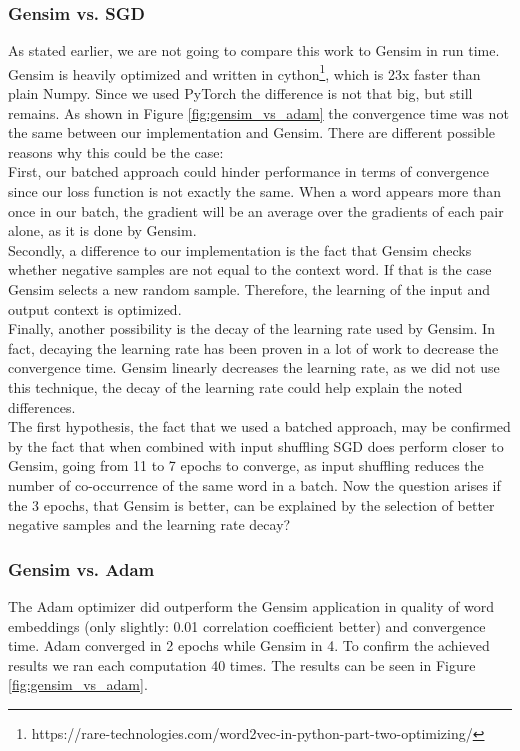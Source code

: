 \documentclass[conference]{IEEEtran}
\begin{document}
\subsubsection{Gensim vs. SGD}
As stated earlier, we are not going to compare this work to Gensim in run time. Gensim is heavily optimized and written in cython\footnote{https://rare-technologies.com/word2vec-in-python-part-two-optimizing/}, which is 23x faster than plain Numpy. Since we used PyTorch the difference is not that big, but still remains. As shown in Figure \ref{fig:gensim_vs_adam} the convergence time was not the same between our implementation and Gensim. There are different possible reasons why this could be the case:\\ First, our batched approach could hinder performance in terms of convergence since our loss function is not exactly the same. When a word appears more than once in our batch, the gradient will be an average over the gradients of each pair alone, as it is done by Gensim.\\ Secondly, a difference to our implementation is the fact that Gensim checks whether negative samples are not equal to the context word. If that is the case Gensim selects a new random sample. Therefore, the learning of the input and output context is optimized. \\Finally, another possibility is the decay of the learning rate used by Gensim. In fact, decaying the learning rate has been proven in a lot of work to decrease the convergence time. Gensim linearly decreases the learning rate, as we did not use this technique, the decay of the learning rate could help explain the noted differences. \\ The first hypothesis, the fact that we used a batched approach, may be confirmed by the fact that when combined with input shuffling SGD does perform closer to Gensim, going from 11 to 7 epochs to converge, as input shuffling reduces the number of co-occurrence of the same word in a batch.
Now the question arises if the 3 epochs, that Gensim is better, can be explained by the selection of better negative samples and the learning rate decay?

\subsubsection{Gensim vs. Adam}
The Adam optimizer did outperform the Gensim application in quality of word embeddings (only slightly: 0.01 correlation coefficient better) and convergence time. Adam converged in 2 epochs while Gensim in 4. To confirm the achieved results we ran each computation 40 times. The results can be seen in Figure \ref{fig:gensim_vs_adam}.
\end{document}

